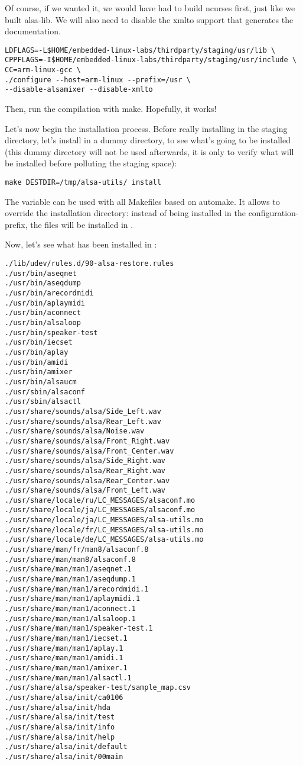Of course, if we wanted it, we would have had to build ncurses first,
just like we built alsa-lib. We will also need to disable the xmlto
support that generates the documentation.

\begin{verbatim}
LDFLAGS=-L$HOME/embedded-linux-labs/thirdparty/staging/usr/lib \
CPPFLAGS=-I$HOME/embedded-linux-labs/thirdparty/staging/usr/include \
CC=arm-linux-gcc \
./configure --host=arm-linux --prefix=/usr \
--disable-alsamixer --disable-xmlto
\end{verbatim}

Then, run the compilation with make. Hopefully, it works!

Let's now begin the installation process.  Before really installing in
the staging directory, let's install in a dummy directory, to see
what's going to be installed (this dummy directory will not be used
afterwards, it is only to verify what will be installed before
polluting the staging space):

\begin{verbatim}
make DESTDIR=/tmp/alsa-utils/ install
\end{verbatim}

The  variable can be used with all Makefiles based on
automake. It allows to override the installation directory: instead of
being installed in the configuration-prefix, the files will be
installed in .

Now, let's see what has been installed in \code{/tmp/alsa-utils/}:

\begin{verbatim}
./lib/udev/rules.d/90-alsa-restore.rules
./usr/bin/aseqnet
./usr/bin/aseqdump
./usr/bin/arecordmidi
./usr/bin/aplaymidi
./usr/bin/aconnect
./usr/bin/alsaloop
./usr/bin/speaker-test
./usr/bin/iecset
./usr/bin/aplay
./usr/bin/amidi
./usr/bin/amixer
./usr/bin/alsaucm
./usr/sbin/alsaconf
./usr/sbin/alsactl
./usr/share/sounds/alsa/Side_Left.wav
./usr/share/sounds/alsa/Rear_Left.wav
./usr/share/sounds/alsa/Noise.wav
./usr/share/sounds/alsa/Front_Right.wav
./usr/share/sounds/alsa/Front_Center.wav
./usr/share/sounds/alsa/Side_Right.wav
./usr/share/sounds/alsa/Rear_Right.wav
./usr/share/sounds/alsa/Rear_Center.wav
./usr/share/sounds/alsa/Front_Left.wav
./usr/share/locale/ru/LC_MESSAGES/alsaconf.mo
./usr/share/locale/ja/LC_MESSAGES/alsaconf.mo
./usr/share/locale/ja/LC_MESSAGES/alsa-utils.mo
./usr/share/locale/fr/LC_MESSAGES/alsa-utils.mo
./usr/share/locale/de/LC_MESSAGES/alsa-utils.mo
./usr/share/man/fr/man8/alsaconf.8
./usr/share/man/man8/alsaconf.8
./usr/share/man/man1/aseqnet.1
./usr/share/man/man1/aseqdump.1
./usr/share/man/man1/arecordmidi.1
./usr/share/man/man1/aplaymidi.1
./usr/share/man/man1/aconnect.1
./usr/share/man/man1/alsaloop.1
./usr/share/man/man1/speaker-test.1
./usr/share/man/man1/iecset.1
./usr/share/man/man1/aplay.1
./usr/share/man/man1/amidi.1
./usr/share/man/man1/amixer.1
./usr/share/man/man1/alsactl.1
./usr/share/alsa/speaker-test/sample_map.csv
./usr/share/alsa/init/ca0106
./usr/share/alsa/init/hda
./usr/share/alsa/init/test
./usr/share/alsa/init/info
./usr/share/alsa/init/help
./usr/share/alsa/init/default
./usr/share/alsa/init/00main
\end{verbatim}

